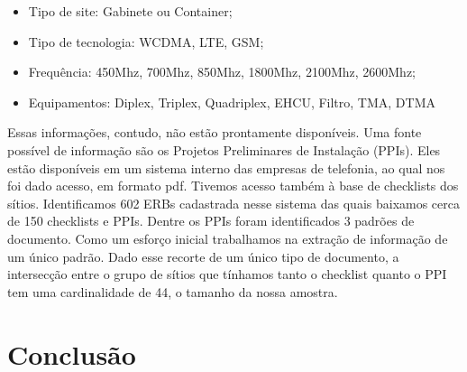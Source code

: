 \documentclass[
	12pt,				%
	openany,			%
	oneside,			%
	a4paper,			%
	english,			%
	french,				%
	spanish,			%
	brazil,				%
	]{abntex2}
\begin{document}
\begin{itemize}
\item Tipo de site: Gabinete ou Container;
\item Tipo de tecnologia: WCDMA, LTE, GSM;
\item Frequência: 450Mhz, 700Mhz, 850Mhz, 1800Mhz,  2100Mhz, 2600Mhz;
  \item Equipamentos: Diplex, Triplex, Quadriplex, EHCU, Filtro, TMA, DTMA
\end{itemize}

Essas informações, contudo, não estão prontamente disponíveis. Uma fonte
possível de informação são os Projetos Preliminares de Instalação (PPIs). Eles
estão disponíveis em um sistema interno das empresas de telefonia, ao qual nos
foi dado acesso, em formato pdf. Tivemos acesso também à base de checklists dos
sítios. Identificamos 602 ERBs cadastrada nesse sistema das quais baixamos cerca
de 150 checklists e PPIs. Dentre os PPIs foram identificados 3 padrões de
documento. Como um esforço inicial trabalhamos na extração de informação de um
único padrão. Dado esse recorte de um único tipo de documento, a intersecção
entre o grupo de sítios que tínhamos tanto o checklist quanto o PPI tem uma
cardinalidade de 44, o tamanho da nossa amostra.



\chapter*[Conclusão]{Conclusão}


\postextual



%
%


\printindex
\end{document}
